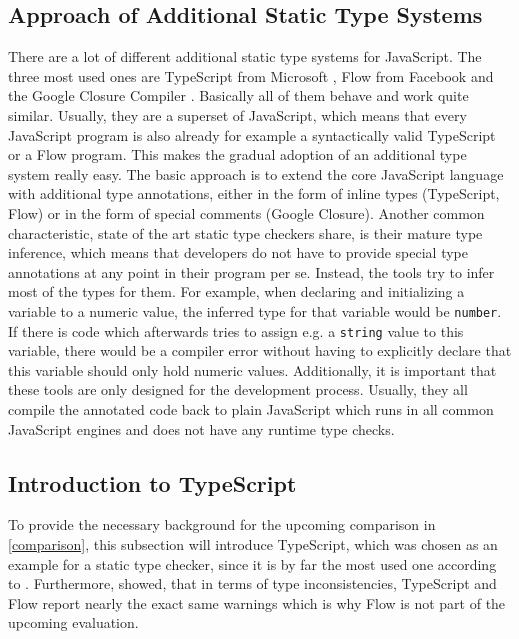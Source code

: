 \documentclass[runningheads,a4paper]{llncs}
\begin{document}
\subsection{Approach of Additional Static Type Systems} \label{staticTypeSystems}
There are a lot of different additional static type systems for JavaScript.
The three most used ones are TypeScript from Microsoft \cite{TypeScript}, Flow from Facebook \cite{Flow} and the Google Closure Compiler \cite{ClosureComiler}.
Basically all of them behave and work quite similar.
Usually, they are a superset of JavaScript, which means that every JavaScript program is also already for example a syntactically valid TypeScript or a Flow program.
This makes the gradual adoption of an additional type system really easy.
The basic approach is to extend the core JavaScript language with additional type annotations, either in the form of inline types (TypeScript, Flow) or in the form of special comments (Google Closure).
Another common characteristic, state of the art static type checkers share, is their mature type inference, which means that developers do not have to provide special type annotations at any point in their program per se.
Instead, the tools try to infer most of the types for them. 
For example, when declaring and initializing a variable to a numeric value, the inferred type for that variable would be \lstinline[columns=fixed]{number}.
If there is code which afterwards tries to assign e.g. a \lstinline[columns=fixed]{string} value to this variable, there would be a compiler error without having to explicitly declare that this variable should only hold numeric values.
Additionally, it is important that these tools are only designed for the development process.
Usually, they all compile the annotated code back to plain JavaScript which runs in all common JavaScript engines and does not have any runtime type checks.


\subsection{Introduction to TypeScript} \label{IntroToTS}
To provide the necessary background for the upcoming comparison in \ref{comparison}, this subsection will introduce TypeScript, which was chosen as an example for a static type checker, since it is by far the most used one according to \cite{StateOfJs}.
Furthermore, \cite{DBLP:conf/icse/GaoBB17} showed, that in terms of type inconsistencies, TypeScript and Flow report nearly the exact same warnings which is why Flow is not part of the upcoming evaluation.\\
\end{document}
